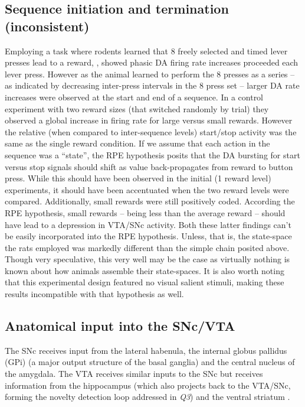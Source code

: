 \documentclass[doc]{apa}        %
\begin{document}
\subsection{Sequence initiation and termination (inconsistent)} %
\label{sub:goal}
Employing a task where rodents learned that 8 freely selected and timed lever presses lead to a reward, , showed phasic DA firing rate increases proceeded each lever press.  However as the animal learned to perform the 8 presses as a series -- as indicated by decreasing inter-press intervals in the 8 press set -- larger DA rate increases were observed at the start and end of a sequence.  In a control experiment with two reward sizes (that switched randomly by trial) they observed a global increase in firing rate for large versus small rewards.  However the relative (when compared to inter-sequence levels) start/stop activity was the same as the single reward condition. If we assume that each action in the sequence was a ``state'', the RPE hypothesis posits that the DA bursting for start versus stop signals should shift as value back-propagates from reward to button press.  While this should have been observed in the initial (1 reward level) experiments, it should have been accentuated when the two reward levels were compared.  Additionally, small rewards were still positively coded.  According the RPE hypothesis, small rewards -- being less than the average reward -- should have lead to a depression in VTA/SNc activity.  Both these latter findings can't be easily incorporated into the RPE hypothesis.  Unless, that is, the state-space the rats employed was markedly different than the simple chain posited above.  Though very speculative, this very well may be the case as virtually nothing is known about how animals assemble their state-spaces.  It is also worth noting that this experimental design featured no visual salient stimuli, making these results incompatible with that hypothesis as well.

	
\subsection{Anatomical input into the SNc/VTA} %
\label{sub:anatomical_input_into_the_snc_vta}

The SNc receives input from the lateral habenula, the internal globus pallidus (GPi) (a major output structure of the basal ganglia) and the central nucleus of the amygdala\cite{Botvinick:2008p6594}.  The VTA receives similar inputs to the SNc but receives information from the hippocampus (which also projects back to the VTA/SNc, forming the novelty detection loop addressed in \emph{Q3}) and the ventral striatum \cite{Joel:2002p6593}.  
\end{document}
